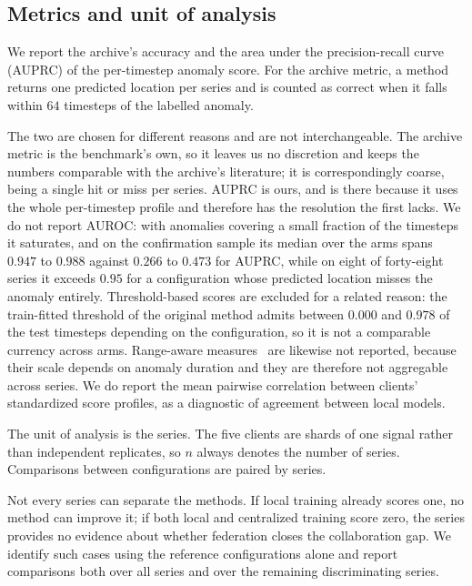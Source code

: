 \documentclass[conference]{IEEEtran}
\begin{document}
\subsection{Metrics and unit of analysis}

We report the archive's accuracy and the area under the precision-recall curve (AUPRC) of the per-timestep anomaly score. For the archive metric, a method returns one predicted location per series and is counted as correct when it falls within $64$ timesteps of the labelled anomaly.

The two are chosen for different reasons and are not interchangeable. The archive metric is the
benchmark's own, so it leaves us no discretion and keeps the numbers comparable with the archive's
literature; it is correspondingly coarse, being a single hit or miss per series. AUPRC is ours, and
is there because it uses the whole per-timestep profile and therefore has the resolution the first
lacks. We do not report AUROC: with anomalies covering a small fraction of the timesteps it
saturates, and on the confirmation sample its median over the arms spans $0.947$ to $0.988$ against
$0.266$ to $0.473$ for AUPRC, while on eight of forty-eight series it exceeds $0.95$ for a
configuration whose predicted location misses the anomaly entirely. Threshold-based scores are
excluded for a related reason: the train-fitted threshold of the original method admits between
$0.000$ and $0.978$ of the test timesteps depending on the configuration, so it is not a comparable
currency across arms. Range-aware measures~\cite{paparrizos2022vus} are likewise not reported,
because their scale depends on anomaly duration and they are therefore not aggregable across
series. We do report the mean pairwise correlation between clients' standardized score profiles, as
a diagnostic of agreement between local models.

The unit of analysis is the series. The five clients are shards of one signal rather than independent replicates, so $n$ always denotes the number of series. Comparisons between configurations are paired by series.

Not every series can separate the methods. If local training already scores one, no method can improve it; if both local and centralized training score zero, the series provides no evidence about whether federation closes the collaboration gap. We identify such cases using the reference configurations alone and report comparisons both over all series and over the remaining discriminating series.
\end{document}
